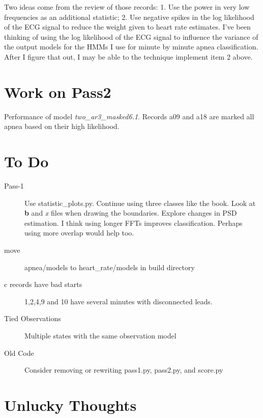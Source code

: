 \documentclass[12pt]{article}
\begin{document}
Two ideas come from the review of those records: 1. Use the power in
very low frequencies as an additional statistic; 2. Use negative
spikes in the log likelihood of the ECG signal to reduce the weight
given to heart rate estimates.  I've been thinking of using the log
likelihood of the ECG signal to influence the variance of the output
models for the HMMs I use for minute by minute apnea classification.
After I figure that out, I may be able to the technique implement item
2 above.

\section{Work on Pass2}
\label{sec:pass2}

\begin{table*}
  \centering
  
  \caption[Performance]{Performance of model
    \emph{two\_ar3\_masked6.1}.  Records a09 and a18 are marked all
    apnea based on their high likelihood.}
  \label{tab:pass2performance}
\end{table*}

\section{To Do}
\label{sec:todo}

\begin{description}
\item[Pass-1] Use statistic\_plots.py.  Continue using three classes
  like the book.  Look at \textbf{b} and \emph{x} files when drawing
  the boundaries.  Explore changes in PSD estimation.  I think using
  longer FFTs improves classification.  Perhaps using more overlap
  would help too.
\item[move] apnea/models to heart\_rate/models in build directory
\item[c records have bad starts] 1,2,4,9 and 10 have several minutes
  with disconnected leads.
\item[Tied Observations] Multiple states with the same observation
  model
\item[Old Code] Consider removing or rewriting pass1.py, pass2.py, and
  score.py 
\end{description}

\section{Unlucky Thoughts}
\label{sec:unlucky}
\end{document}
